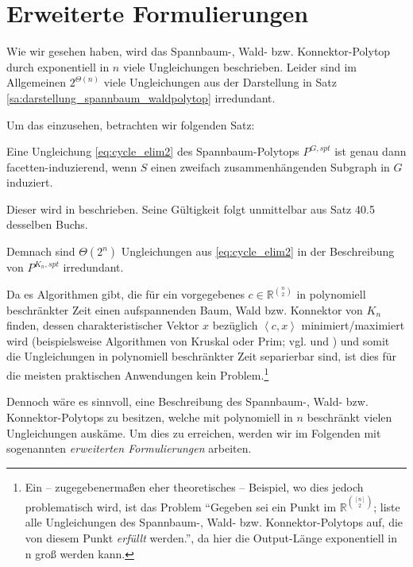 \documentclass[10p,a4paper,BCOR = 12mm, DIV=15]{scrbook}
\begin{document}
\section{Erweiterte Formulierungen}

Wie wir gesehen haben, wird das Spannbaum-, Wald- bzw. Konnektor-Polytop durch exponentiell in $n$ viele Ungleichungen beschrieben. Leider sind im Allgemeinen $2^{\Theta\left(n\right)}$ viele Ungleichungen aus der Darstellung in Satz \ref{sa:darstellung_spannbaum_waldpolytop} irredundant.

Um das einzusehen, betrachten wir folgenden Satz:

\begin{Sa}
Eine Ungleichung \eqref{eq:cycle_elim2} des Spannbaum-Polytops $P^{G, spt}$ ist genau dann facetten-induzierend, wenn $S$ einen zweifach zusammenhängenden Subgraph in $G$ induziert.
\end{Sa}

Dieser wird in \citep[S:~862]{schrijver2003combinatorial} beschrieben. Seine Gültigkeit folgt unmittelbar aus Satz 40.5 desselben Buchs.

Demnach sind $\Theta\left(2^n\right)$ Ungleichungen aus \eqref{eq:cycle_elim2} in der Beschreibung von $P^{K_n, spt}$ irredundant.

Da es Algorithmen gibt, die für ein vorgegebenes $c \in \mathbb{R}^{n \choose 2}$ in polynomiell beschränkter Zeit einen aufspannenden Baum, Wald bzw. Konnektor von $K_n$ finden, dessen charakteristischer Vektor $x$ bezüglich $\left\langle c, x\right\rangle$ minimiert/maximiert wird (beispielsweise Algorithmen von Kruskal oder Prim; vgl. \cite{korte2012combinatorial} und \cite{schrijver2003combinatorial}) und somit die Ungleichungen in polynomiell beschränkter Zeit separierbar sind, ist dies für die meisten praktischen Anwendungen kein Problem.\footnote{Ein -- zugegebenermaßen eher theoretisches -- Beispiel, wo dies jedoch problematisch wird, ist das Problem "`Gegeben sei ein Punkt im $\mathbb{R}^{\left[n\right] \choose 2}$; liste alle Ungleichungen des Spannbaum-, Wald- bzw. Konnektor-Polytops auf, die von diesem Punkt \emph{erfüllt} werden."', da hier die Output-Länge exponentiell in n groß werden kann.}

Dennoch wäre es sinnvoll, eine Beschreibung des Spannbaum-, Wald- bzw. Konnek\-tor-Polytops zu besitzen, welche mit polynomiell in $n$ beschränkt vielen Ungleichungen auskäme. Um dies zu erreichen, werden wir im Folgenden mit sogenannten \emph{erweiterten Formulierungen} arbeiten.
\end{document}
